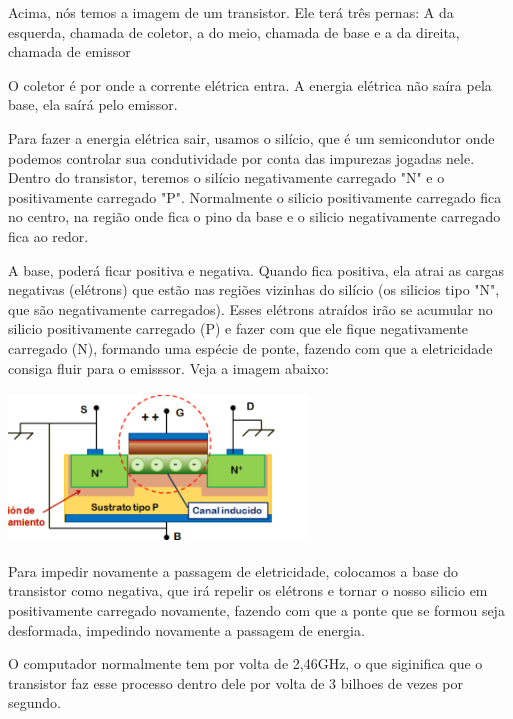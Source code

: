 \documentclass[12pt,a4paper]{report}
\begin{document}
	
	
	Acima, nós temos a imagem de um transistor. Ele terá três pernas: A da esquerda, chamada de coletor, a do meio, chamada de base e a da direita, chamada de emissor
	
	O coletor é por onde a corrente elétrica entra. A energia elétrica não saíra pela base, ela saírá pelo emissor.
	
	Para fazer a energia elétrica sair, usamos o silício, que é um semicondutor onde podemos controlar sua condutividade por conta das impurezas jogadas nele. Dentro do transistor, teremos o silício negativamente carregado "N" e o positivamente carregado "P". Normalmente o silicio positivamente carregado fica no centro, na região onde fica o pino da base e o silicio negativamente carregado fica ao redor.
	
	
	A base, poderá ficar positiva e negativa. Quando fica positiva, ela atrai as cargas negativas (elétrons) que estão nas regiões vizinhas do silício (os silicios tipo "N", que são negativamente carregados). Esses elétrons atraídos irão se acumular no silicio positivamente carregado (P) e fazer com que ele fique negativamente carregado (N), formando uma espécie de ponte, fazendo com que a eletricidade consiga fluir para o emisssor. Veja a imagem abaixo:
	
	\begin{center}
		
		\includegraphics[width=8cm,height=4cm,keepaspectratio=false]{imagens-teoria/transistor2.png}
		
	\end{center}
	
	
	Para impedir novamente a passagem de eletricidade, colocamos a base do transistor como negativa, que irá repelir os elétrons e tornar o nosso silicio em positivamente carregado novamente, fazendo com que a ponte que se formou seja desformada, impedindo novamente a passagem de energia. 
	
	O computador normalmente tem por volta de 2,46GHz, o que siginifica que o transistor faz esse processo dentro dele por volta de 3 bilhoes de vezes por segundo.
	
\end{document}
